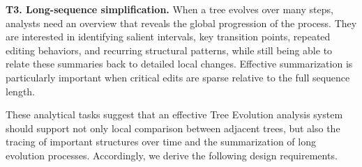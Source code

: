 \textbf{T3. Long-sequence simplification.}
When a tree evolves over many steps, analysts need an overview that reveals the global progression of the process. They are interested in identifying salient intervals, key transition points, repeated editing behaviors, and recurring structural patterns, while still being able to relate these summaries back to detailed local changes. Effective summarization is particularly important when critical edits are sparse relative to the full sequence length.


These analytical tasks suggest that an effective Tree Evolution analysis system should support not only local comparison between adjacent trees, but also the tracing of important structures over time and the summarization of long evolution processes. Accordingly, we derive the following design requirements.

%
%
%
%



